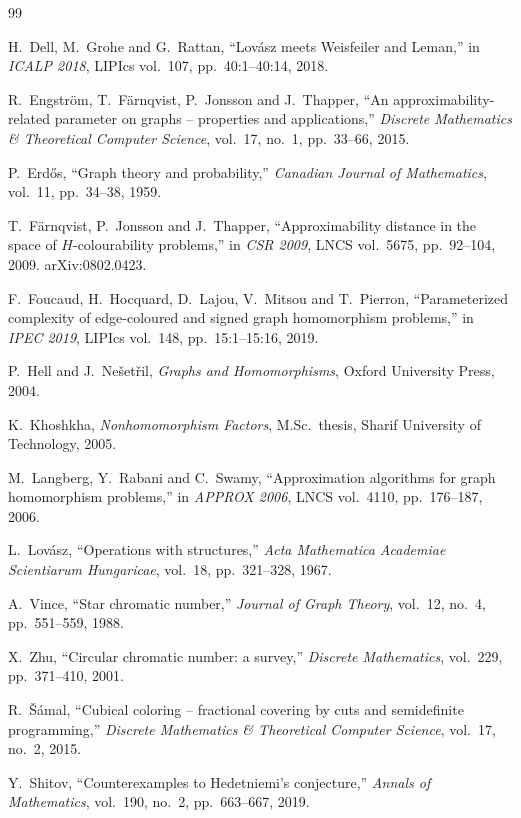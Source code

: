 \documentclass{article}
\begin{document}
\begin{thebibliography}{99}

H.~Dell, M.~Grohe and G.~Rattan,
``Lov\'asz meets Weisfeiler and Leman,''
in \textit{ICALP 2018}, LIPIcs vol.~107, pp.~40:1--40:14, 2018.

R.~Engstr\"om, T.~F\"arnqvist, P.~Jonsson and J.~Thapper,
``An approximability-related parameter on graphs -- properties and
applications,''
\textit{Discrete Mathematics \& Theoretical Computer Science},
vol.~17, no.~1, pp.~33--66, 2015.

P.~Erd\H{o}s,
``Graph theory and probability,''
\textit{Canadian Journal of Mathematics}, vol.~11, pp.~34--38, 1959.

T.~F\"arnqvist, P.~Jonsson and J.~Thapper,
``Approximability distance in the space of $H$-colourability problems,''
in \textit{CSR 2009}, LNCS vol.~5675, pp.~92--104, 2009.
arXiv:0802.0423.

F.~Foucaud, H.~Hocquard, D.~Lajou, V.~Mitsou and T.~Pierron,
``Parameterized complexity of edge-coloured and signed graph homomorphism
problems,''
in \textit{IPEC 2019}, LIPIcs vol.~148, pp.~15:1--15:16, 2019.

P.~Hell and J.~Ne\v{s}et\v{r}il,
\textit{Graphs and Homomorphisms},
Oxford University Press, 2004.

K.~Khoshkha,
\textit{Nonhomomorphism Factors},
M.Sc.\ thesis, Sharif University of Technology, 2005.

M.~Langberg, Y.~Rabani and C.~Swamy,
``Approximation algorithms for graph homomorphism problems,''
in \textit{APPROX 2006}, LNCS vol.~4110, pp.~176--187, 2006.

L.~Lov\'asz,
``Operations with structures,''
\textit{Acta Mathematica Academiae Scientiarum Hungaricae}, vol.~18,
pp.~321--328, 1967.

A.~Vince,
``Star chromatic number,''
\textit{Journal of Graph Theory}, vol.~12, no.~4, pp.~551--559, 1988.

X.~Zhu,
``Circular chromatic number: a survey,''
\textit{Discrete Mathematics}, vol.~229, pp.~371--410, 2001.

R.~\v{S}\'amal,
``Cubical coloring -- fractional covering by cuts and semidefinite
programming,''
\textit{Discrete Mathematics \& Theoretical Computer Science},
vol.~17, no.~2, 2015.

Y.~Shitov,
``Counterexamples to Hedetniemi's conjecture,''
\textit{Annals of Mathematics}, vol.~190, no.~2, pp.~663--667, 2019.

\end{thebibliography}
\end{document}
